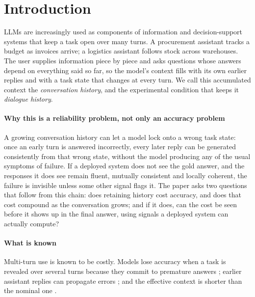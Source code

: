 \section{Introduction}
\label{sec:introduction}

LLMs are increasingly used as components of information and decision-support
systems that keep a task open over many turns. A procurement assistant tracks a
budget as invoices arrive; a logistics assistant follows stock across
warehouses. The user supplies information piece by piece and asks questions
whose answers depend on everything said so far, so the model's context fills
with its own earlier replies and with a task state that changes at every turn.
We call this accumulated context the \emph{conversation history}, and the
experimental condition that keeps it \emph{dialogue history}.

\paragraph{Why this is a reliability problem, not only an accuracy problem}
A growing conversation history can let a model lock onto a wrong task state:
once an early turn is answered incorrectly, every later reply can be generated
consistently from that wrong state, without the model producing any of the
usual symptoms of failure. If a deployed system does not see the gold answer,
and the responses it does see remain fluent, mutually consistent and locally
coherent, the failure is invisible unless some other signal flags it. The paper
asks two questions that follow from this chain: does retaining history cost
accuracy, and does that cost compound as the conversation grows; and if it
does, can the cost be seen before it shows up in the final answer, using
signals a deployed system can actually compute?

\paragraph{What is known}
Multi-turn use is known to be costly. Models lose accuracy when a task is
revealed over several turns because they commit to premature answers
\citep{laban2025lost}; earlier assistant replies can propagate errors
\citep{huang2026benefit}; and the effective context is shorter than the
nominal one \citep{liu2024lost,hsieh2024ruler}.

